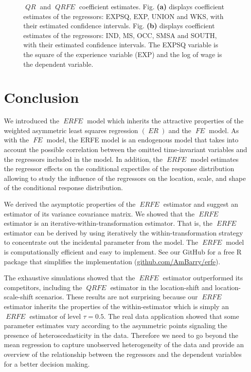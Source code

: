 \documentclass[15pt,a4paper]{article}
\DeclareMathOperator{\ERFE}{\textit{ERFE}}
\DeclareMathOperator{\QRFE}{\textit{QRFE}}
\DeclareMathOperator{\ER}{\textit{ER}}
\DeclareMathOperator{\QR}{\textit{QR}}
\DeclareMathOperator{\FE}{\textit{FE}}
\begin{document}
\begin{figure}
\begin{subfigure}[b]{0.49\textwidth}
         \caption{}
         \label{fig:cross1_qr_qrfe2}
     \end{subfigure}
       \caption{ $\QR$ and $\QRFE$ coefficient estimates. Fig. \textbf{(a)} displays coefficient estimates of the regressors: EXPSQ, EXP, UNION and WKS, with their estimated confidence intervals. Fig. \textbf{(b)} displays coefficient estimates of the regressors: IND, MS, OCC, SMSA and SOUTH, with their estimated confidence intervals. The EXPSQ variable is the square of the experience variable (EXP) and the log of wage is the dependent variable.}
        \label{fig:cross1_qr_qrfe}
\end{figure}


\section{Conclusion}\label{Conclusion_erfe}

We introduced the $\ERFE$ model which inherits the attractive properties of the weighted asymmetric least squares regression $(\ER)$ and the $\FE$ model. As with the $\FE$ model, the ERFE model is an endogenous model that takes into account the possible correlation between the omitted time-invariant variables and the regressors included in the model. In addition, the $\ERFE$ model estimates the regressor effects on the conditional expectiles of the response distribution allowing to study the influence of the regressors on the location, scale, and shape of the conditional response distribution. 


We derived the asymptotic properties of the $\ERFE$ estimator and suggest an estimator of its variance covariance matrix. We showed that the $\ERFE$ estimator is an iterative-within-transformation estimator. That is, the $\ERFE$ estimator can be derived by using iteratively the within-transformation strategy to concentrate out the incidental parameter from the model. The $\ERFE$ model is computationally efficient and easy to implement. See our GitHub for a free R package that simplifies the implementation (\url{github.com/AmBarry/erfe}). 

The exhaustive simulations showed that the $\ERFE$ estimator outperformed its competitors, including the $\QRFE$ estimator in the location-shift and location-scale-shift scenarios. These results are not surprising because our $\ERFE$ estimator inherits the properties of the within-estimator which is simply an $\ERFE$ estimator of level $\tau=0.5.$ The real data application showed that some parameter estimates vary according to the asymmetric points signaling the presence of heteroscedasticity in the data. Therefore we need to go beyond the mean regression to capture unobserved heterogeneity of the data and provide an overview of the relationship between the regressors and the dependent variables for a better decision making.
\end{document}
